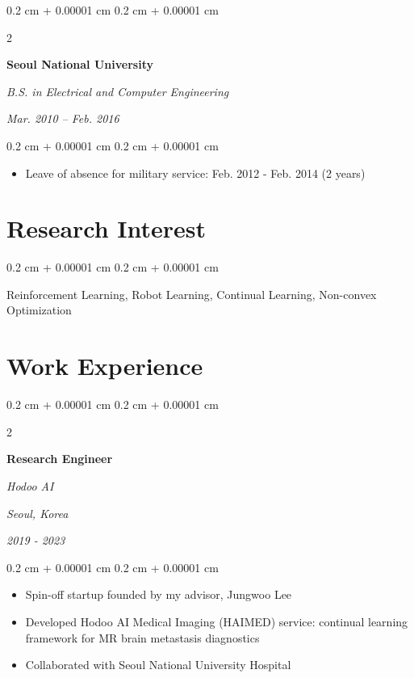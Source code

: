 \documentclass[10pt, letterpaper]{article}
\newenvironment{highlights}{
    \begin{itemize}[
        topsep=0.10 cm,
        parsep=0.10 cm,
        partopsep=0pt,
        itemsep=0pt,
        leftmargin=0.4 cm + 10pt
    ]
}{
    \end{itemize}
} %
\newenvironment{onecolentry}{
    \begin{adjustwidth}{
        0.2 cm + 0.00001 cm
    }{
        0.2 cm + 0.00001 cm
    }
}{
    \end{adjustwidth}
} %
\newenvironment{twocolentry}[2][]{
    \onecolentry
    \def\secondColumn{#2}
    \setcolumnwidth{\fill, 4.5 cm}
    \begin{paracol}{2}
}{
    \switchcolumn \raggedleft \secondColumn
    \end{paracol}
    \endonecolentry
} %
\begin{document}
        
        \begin{twocolentry}{
            
            
        \textit{Mar. 2010 – Feb. 2016}}
            \textbf{Seoul National University}

            \textit{B.S. in Electrical and Computer Engineering}
        \end{twocolentry}

        \vspace{0.10 cm}
        \begin{onecolentry}
            \begin{highlights}
                \item Leave of absence for military service: Feb. 2012 - Feb. 2014 (2 years)
            \end{highlights}
        \end{onecolentry}


        \section{Research Interest}

        
        \begin{onecolentry}
            Reinforcement Learning, Robot Learning, Continual Learning, Non-convex Optimization
        \end{onecolentry}



    
    \section{Work Experience}



        
        \begin{twocolentry}{
        \textit{Seoul, Korea}    
            
        \textit{2019 - 2023}}
            \textbf{Research Engineer}
            
            \textit{Hodoo AI}
        \end{twocolentry}

        \vspace{0.10 cm}
        \begin{onecolentry}
            \begin{highlights}
                \item Spin-off startup founded by my advisor, Jungwoo Lee
                \item Developed Hodoo AI Medical Imaging (HAIMED) service: continual learning framework for MR brain metastasis diagnostics
                \item Collaborated with Seoul National University Hospital
            \end{highlights}
        \end{onecolentry}
\end{document}
